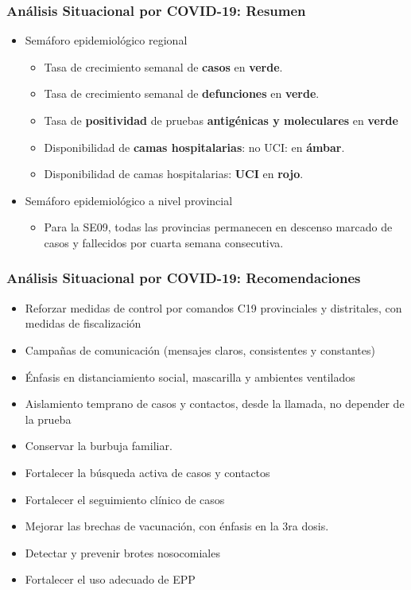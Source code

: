 \documentclass[xcolor=table]{beamer}
\begin{document}
\begin{frame}
	\frametitle{Análisis Situacional por COVID-19: Resumen}
	\vspace{-.5cm}
	\begin{itemize}
		\item Semáforo epidemiológico regional
		\begin{itemize}
			\item Tasa de crecimiento semanal de \textbf{\color{mycolor4}casos} en \textbf{\color{mycolor3}verde}.
			\item Tasa de crecimiento semanal de \textbf{\color{mycolor4}defunciones} en \textbf{\color{mycolor3}verde}.
			\item Tasa de \textbf{\color{mycolor4}positividad} de pruebas \textbf{\color{mycolor4}antigénicas y moleculares} en \textbf{\color{mycolor3}verde}
			\item Disponibilidad de \textbf{\color{mycolor4}camas hospitalarias}: no UCI: en \textbf{\color{mycolor3}ámbar}.
			\item Disponibilidad de camas hospitalarias: \textbf{\color{mycolor4}UCI} en \textbf{\color{mycolor3}rojo}.
		\end{itemize} 
		\item Semáforo epidemiológico a nivel provincial
		\begin{itemize}
			\item Para la SE09, todas las provincias permanecen en  descenso marcado de casos y fallecidos por cuarta semana consecutiva.
	
		\end{itemize}
	\end{itemize}
\end{frame}

\begin{frame}[label=recomendaciones]
	\frametitle{Análisis Situacional por COVID-19: Recomendaciones}
	\vspace{-.5cm}
	\begin{itemize}
			\item Reforzar medidas de control por comandos C19 provinciales y distritales, con medidas de fiscalización
			\item Campañas de comunicación (mensajes claros, consistentes y constantes)
			\item Énfasis en distanciamiento social, mascarilla y ambientes ventilados
			\item Aislamiento temprano de casos y contactos, desde la llamada, no depender de la prueba
			\item Conservar la burbuja familiar. 
			\item Fortalecer la búsqueda activa de casos y contactos
			\item Fortalecer el seguimiento clínico de casos
			\item Mejorar las brechas de vacunación, con énfasis en la 3ra dosis.
			\item Detectar y prevenir brotes nosocomiales
			\item Fortalecer el uso adecuado de EPP
			
		\end{itemize} 

\end{frame}
\end{document}
